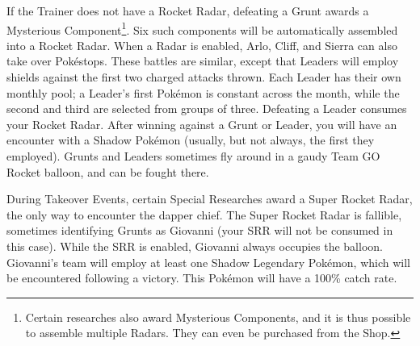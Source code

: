 If the Trainer does not have a Rocket Radar, defeating a Grunt awards a Mysterious Component\footnote{Certain researches also award Mysterious Components, and it is thus possible to assemble multiple Radars. They can even be purchased from the Shop.}.
Six such components will be automatically assembled into a Rocket Radar.
When a Radar is enabled, Arlo, Cliff, and Sierra can also take over Pokéstops.
These battles are similar, except that Leaders will employ shields against the first two charged attacks thrown.
Each Leader has their own monthly pool; a Leader's first Pokémon is constant
 across the month, while the second and third are selected from groups of three.
Defeating a Leader consumes your Rocket Radar.
After winning against a Grunt or Leader, you will have an encounter with a Shadow Pokémon (usually,
 but not always, the first they employed).
Grunts and Leaders sometimes fly around in a gaudy Team GO Rocket balloon,
  and can be fought there.

During Takeover Events, certain Special Researches award a Super Rocket Radar,
 the only way to encounter the dapper chief.
The Super Rocket Radar is fallible, sometimes identifying Grunts as Giovanni
 (your SRR will not be consumed in this case).
While the SRR is enabled, Giovanni always occupies the balloon.
Giovanni's team will employ at least one Shadow Legendary Pokémon, which
 will be encountered following a victory.
This Pokémon will have a 100\% catch rate.
